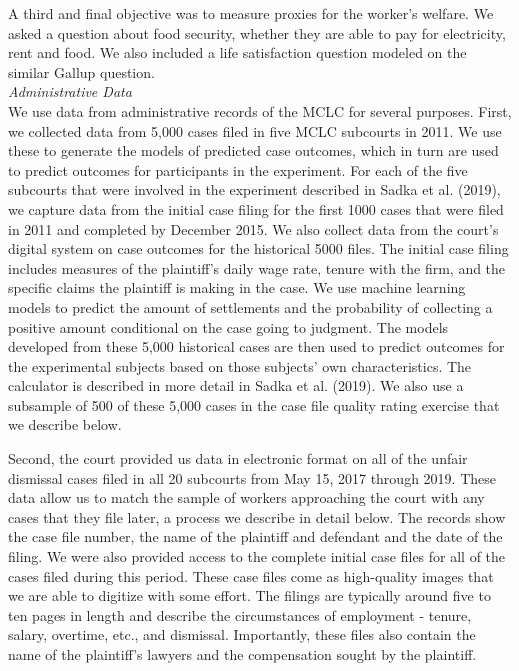 \documentclass[oneside,12pt]{article}
\begin{document}
A third and final objective was to measure proxies for the worker’s welfare. We asked a question about food security, whether they are able to pay for electricity, rent and food. We also included a life satisfaction question modeled on the similar Gallup question.
\[\]
\noindent\emph{Administrative Data}\\
We use data from administrative records of the MCLC for several purposes. First, we collected data from 5,000 cases filed in five MCLC subcourts in 2011. We use these to generate the models of predicted case outcomes, which in turn are used to predict outcomes for participants in the experiment. For each of the five subcourts that were involved in the experiment described in Sadka et al. (2019), we capture data from the initial case filing for the first 1000 cases that were filed in 2011 and completed by December 2015. We also collect data from the court’s digital system on case outcomes for the historical 5000 files. The initial case filing includes measures of the plaintiff’s daily wage rate, tenure with the firm, and the specific claims the plaintiff is making in the case. We use machine learning models to predict the amount of settlements and the probability of collecting a positive amount conditional on the case going to judgment. The models developed from these 5,000 historical cases are then used to predict outcomes for the experimental subjects based on those subjects’ own characteristics. The calculator is described in more detail in Sadka et al. (2019). We also use a subsample of 500 of these 5,000 cases in the case file quality rating exercise that we describe below. 

Second, the court provided us data in electronic format on all of the unfair dismissal cases filed in all 20 subcourts from May 15, 2017 through 2019. These data allow us to match the sample of workers approaching the court with any cases that they file later, a process we describe in detail below. The records show the case file number, the name of the plaintiff and defendant and the date of the filing. We were also provided access to the complete initial case files for all of the cases filed during this period. These case files come as high-quality images that we are able to digitize with some effort. The filings are typically around five to ten pages in length and describe the circumstances of employment - tenure, salary, overtime, etc., and dismissal. Importantly, these files also contain the name of the plaintiff’s lawyers and the compensation sought by the plaintiff.
\end{document}
